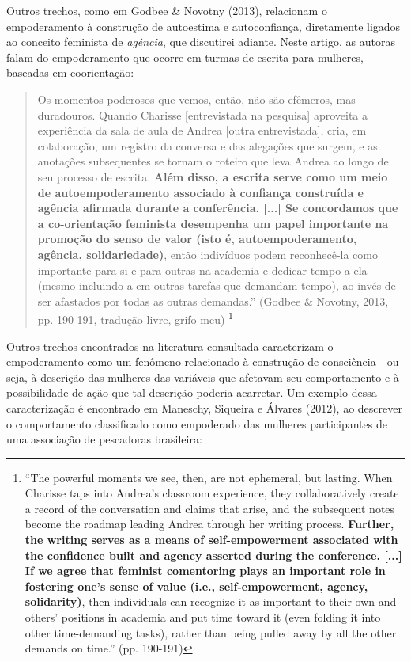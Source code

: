 Outros trechos, como em Godbee \& Novotny (2013), relacionam o empoderamento à construção de autoestima e autoconfiança, diretamente ligados ao conceito feminista de \textit{agência}, que discutirei adiante. Neste artigo, as autoras falam do empoderamento que ocorre em turmas de escrita para mulheres, baseadas em coorientação:

\begin{quote}
    Os momentos poderosos que vemos, então, não são efêmeros, mas duradouros. Quando Charisse [entrevistada na pesquisa] aproveita a experiência da sala de aula de Andrea [outra entrevistada], cria, em colaboração, um registro da conversa e das alegações que surgem, e as anotações subsequentes se tornam o roteiro que leva Andrea ao longo de seu processo de escrita. \textbf{Além disso, a escrita serve como um meio de autoempoderamento associado à confiança construída e agência afirmada durante a conferência. [...] Se concordamos que a co-orientação feminista desempenha um papel importante na promoção do senso de valor (isto é, autoempoderamento, agência, solidariedade)}, então indivíduos podem reconhecê-la como importante para si e para outras na academia e dedicar tempo a ela (mesmo incluindo-a em outras tarefas que demandam tempo), ao invés de ser afastados por todas as outras demandas.'' (Godbee \& Novotny, 2013, pp. 190-191, tradução livre, grifo meu) \footnote{``The powerful moments we see, then, are not ephemeral, but lasting. When Charisse taps into Andrea’s classroom experience, they collaboratively create a record of the conversation and claims that arise, and the subsequent notes become the roadmap leading Andrea through her writing process. \textbf{Further, the writing serves as a means of self-empowerment associated with the confidence built and agency asserted during the conference. [...] If we agree that feminist comentoring plays an important role in fostering one’s sense of value (i.e., self-empowerment, agency, solidarity)}, then individuals can recognize it as important to their own and others’ positions in academia and put time toward it (even folding it into other time-demanding tasks), rather than being pulled away by all the other demands on time.'' (pp. 190-191)}
\end{quote}

Outros trechos encontrados na literatura consultada caracterizam o empoderamento como um fenômeno relacionado à construção de consciência - ou seja, à descrição das mulheres das variáveis que afetavam seu comportamento e à possibilidade de ação que tal descrição poderia acarretar. Um exemplo dessa caracterização é encontrado em Maneschy, Siqueira e Álvares (2012), ao descrever o comportamento classificado como empoderado das mulheres participantes de uma associação de pescadoras brasileira:

